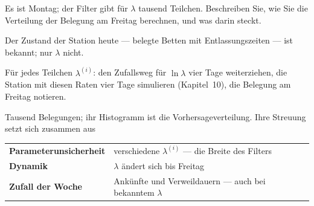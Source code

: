 \begin{aufgabe}
Es ist Montag; der Filter gibt für $\lambda$ tausend Teilchen. Beschreiben Sie, wie Sie die Verteilung der Belegung am Freitag berechnen, und was darin steckt.

\loesung
{}
Der Zustand der Station heute --- belegte Betten mit Entlassungszeiten --- ist bekannt; nur $\lambda$ nicht.

Für jedes Teilchen $\lambda^{(i)}$: den Zufallsweg für $\ln\lambda$ vier Tage weiterziehen, die Station mit diesen Raten vier Tage simulieren (Kapitel~10), die Belegung am Freitag notieren.

Tausend Belegungen; ihr Histogramm ist die Vorhersageverteilung. Ihre Streuung setzt sich zusammen aus
\begin{center}
{\small
\renewcommand{\arraystretch}{1.5}
\begin{tabular}{@{}P{3.6cm}P{5.0cm}@{}}
\toprule
\textbf{Parameter\-unsicher\-heit} & verschiedene $\lambda^{(i)}$ --- die Breite des Filters\\
\textbf{Dynamik} & $\lambda$ ändert sich bis Freitag\\
\textbf{Zufall der Woche} & Ankünfte und Verweildauern --- auch bei bekanntem $\lambda$\\
\bottomrule
\end{tabular}}
\end{center}

\begin{center}
\begin{minipage}{0.88\textwidth}
\end{minipage}
\end{center}
\end{aufgabe}

